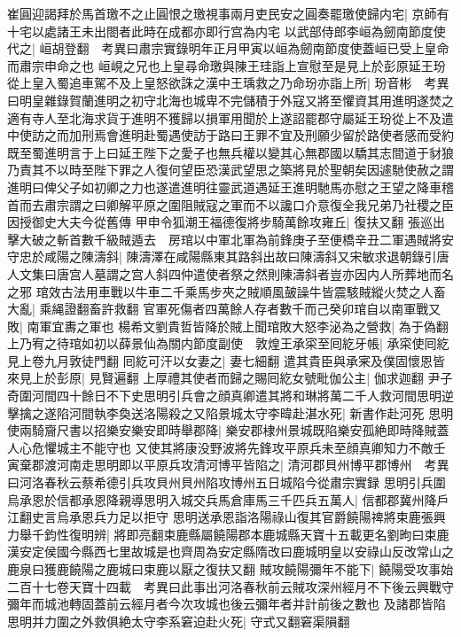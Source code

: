崔圓迎謁拜於馬首璬不之止圓恨之璬視事兩月吏民安之圓奏罷璬使歸内宅|{
	京師有十宅以處諸王未出閤者此時在成都亦即行宫為内宅}
以武部侍郎李峘為劒南節度使代之|{
	峘胡登翻　考異曰肅宗實錄明年正月甲寅以峘為劒南節度使蓋峘已受上皇命而肅宗申命之也}
峘峴之兄也上皇尋命璬與陳王珪詣上宣慰至是見上於彭原延王玢從上皇入蜀追車駕不及上皇怒欲誅之漢中王瑀救之乃命玢亦詣上所|{
	玢音彬　考異曰明皇雜錄賀蘭進明之初守北海也城卑不完儲積于外寇又將至懼資其用進明遂焚之適有寺人至北海求貨于進明不獲歸以損軍用聞於上遂詔罷郡守屬延王玢從上不及遣中使訪之而加刑焉會進明赴蜀遇使訪于路曰王罪不宜及刑願少留於路使者感而受約既至蜀進明言于上曰延王陛下之愛子也無兵權以變其心無郡國以驕其志間道于豺狼乃責其不以時至陛下罪之人復何望臣恐漢武望思之築將見於聖朝矣因遽馳使赦之謂進明曰俾父子如初卿之力也遂遣進明往靈武道遇延王進明馳馬亦慰之王望之降車稽首而去肅宗謂之曰卿解平原之圍阻賊寇之軍而不以讒口介意復全我兄弟乃社稷之臣因授御史大夫今從舊傳}
甲申令狐潮王福德復將步騎萬餘攻雍丘|{
	復扶又翻}
張巡出擊大破之斬首數千級賊遁去　房琯以中軍北軍為前鋒庚子至便橋辛丑二軍遇賊將安守忠於咸陽之陳濤斜|{
	陳濤澤在咸陽縣東其路斜出故曰陳濤斜又宋敏求退朝錄引唐人文集曰唐宫人墓謂之宫人斜四仲遣使者祭之然則陳濤斜者豈亦因内人所葬地而名之邪}
琯效古法用車戰以牛車二千乘馬步夾之賊順風皷譟牛皆震駭賊縱火焚之人畜大亂|{
	乘䋲證翻畜許救翻}
官軍死傷者四萬餘人存者數千而己癸卯琯自以南軍戰又敗|{
	南軍宜夀之軍也}
楊希文劉貴哲皆降於賊上聞琯敗大怒李泌為之營救|{
	為于偽翻}
上乃宥之待琯如初以薛景仙為關内節度副使　敦煌王承寀至囘紇牙帳|{
	承寀使囘紇見上卷九月敦徒門翻}
囘紇可汗以女妻之|{
	妻七細翻}
遣其貴臣與承宷及僕固懷恩皆來見上於彭原|{
	見賢遍翻}
上厚禮其使者而歸之賜囘紇女號毗伽公主|{
	伽求迦翻}
尹子奇圍河間四十餘日不下史思明引兵會之顔真卿遣其將和琳將萬二千人救河間思明逆擊擒之遂陷河間執李奐送洛陽殺之又陷景城太守李暐赴湛水死|{
	新書作赴河死}
思明使兩騎齎尺書以招樂安樂安即時舉郡降|{
	樂安郡棣州景城既陷樂安孤絶即時降賊蓋人心危懼城主不能守也}
又使其將康没野波將先鋒攻平原兵未至顔真卿知力不敵壬寅棄郡渡河南走思明即以平原兵攻清河博平皆陷之|{
	清河郡貝州博平郡博州　考異曰河洛春秋云蔡希德引兵攻貝州貝州陷攻博州五日城陷今從肅宗實録}
思明引兵圍烏承恩於信都承恩降親導思明入城交兵馬倉庫馬三千匹兵五萬人|{
	信都郡冀州降戶江翻史言烏承恩兵力足以拒守}
思明送承恩詣洛陽祿山復其官爵饒陽禆將束鹿張興力舉千鈞性復明辨|{
	將即亮翻束鹿縣屬饒陽郡本鹿城縣天寶十五載更名劉昫曰束鹿漢安定侯國今縣西七里故城是也齊周為安定縣隋改曰鹿城明皇以安祿山反改常山之鹿泉曰獲鹿饒陽之鹿城曰束鹿以厭之復扶又翻}
賊攻饒陽彌年不能下|{
	饒陽受攻事始二百十七卷天寶十四載　考異曰此事出河洛春秋前云賊攻深州經月不下後云興戰守彌年而城池轉固蓋前云經月者今次攻城也後云彌年者并計前後之數也}
及諸郡皆陷思明并力圍之外救俱絶太守李系窘迫赴火死|{
	守式又翻窘渠隕翻}
